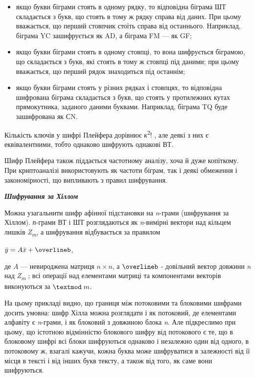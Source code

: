 \liststyleWWviiiNumxxx
\begin{itemize}
\item якщо букви біграми стоять в одному рядку, то відповідна біграма ШТ
складається з букв, що стоять в тому ж рядку справа від даних. При цьому
вважається, що перший стовпчик стоїть справа від останнього. Наприклад, біграма
YC зашифрується як AD, а біграма FM --- як GF;
\item якщо букви біграми стоять в одному стовпці, то вона шифрується біграмою,
що складається з букв, які стоять в тому ж стовпці під даними; при цьому
вважається, що перший рядок знаходиться під останнім;
\item якщо букви біграми стоять у різних рядках і стовпцях, то відповідна
шифрована біграма складається з букв, що стоять у протилежних кутах
прямокутника, заданого даними буквами. Наприклад, біграма TQ буде зашифрована
як СN.
\end{itemize}
Кількість ключів у шифрі Плейфера дорівнює \textit{к}\textsuperscript{2}!  , але
деякі з них є еквівалентними, тобто однаково шифрують однакові ВТ.

Шифр Плейфера також піддається частотному аналізу, хоча й дуже копіткому. При
криптоаналізі використовують як частоти біграм, так і деякі обмеження і
закономірності, що випливають з правил шифрування.


\bigskip


\bigskip

{\centering\bfseries\itshape
Шифрування за Хіллом
\par}


\bigskip


\bigskip

Можна узагальнити шифр афінної підстановки на \textit{n}{}-грами (шифрування за
Хіллом). \textit{п}{}-грами ВТ і ШТ розглядаються як \textit{n}{}-вимірні
вектори над кільцем лишків \textit{Z}\textit{\textsubscript{m}}, а шифрування
відбувається за правилом

{\centering
 $\bar{y}=A\bar{x}+\overlineb$,
\par}

де  $A$ --- невироджена матриця   $n\times n$, а  $\overlineb$ -
довільний вектор довжини \textit{n} над
\textit{Z}\textit{\textsubscript{m}}\textsubscript{ }; всі операції над
елементами матриці та компонентами векторів виконуються за  $\textmod\;m$.

На цьому прикладі видно, що границя між потоковими та блоковими шифрами досить
умовна: шифр Хілла можна розглядати і як потоковий, де елементами алфавіту є
\textit{n}{}-грами, і як блоковий з довжиною блока \textit{n}. Але підкреслимо
при цьому, що істотною відмінністю блокового шифру від потокового є те, що в
блоковому шифрі всі блоки шифруються однаково і незалежно один від одного, в
потоковому ж, взагалі кажучи, кожна буква може шифруватися в залежності від її
місця в тексті і від інших букв тексту, а також від того, як саме вони
шифруються.


